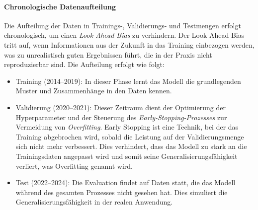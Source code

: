 \paragraph{Chronologische Datenaufteilung}
Die Aufteilung der Daten in Trainings-, Validierungs- und Testmengen erfolgt chronologisch, um einen \emph{Look-Ahead-Bias} zu verhindern. Der Look-Ahead-Bias tritt auf, wenn Informationen aus der Zukunft in das Training einbezogen werden, was zu unrealistisch guten Ergebnissen führt, die in der Praxis nicht reproduzierbar sind. Die Aufteilung erfolgt wie folgt:
\begin{itemize}
    \item Training (2014--2019): In dieser Phase lernt das Modell die grundlegenden Muster und Zusammenhänge in den Daten kennen. 
    \item Validierung (2020--2021): Dieser Zeitraum dient der Optimierung der Hyperparameter und der Steuerung des \emph{Early-Stopping-Prozesses} zur Vermeidung von \emph{Overfitting}. Early Stopping ist eine Technik, bei der das Training abgebrochen wird, sobald die Leistung auf der Validierungsmenge sich nicht mehr verbessert. Dies verhindert, dass das Modell zu stark an die Trainingsdaten angepasst wird und somit seine Generalisierungsfähigkeit verliert, was Overfitting genannt wird.
    \item Test (2022--2024): Die Evaluation findet auf Daten statt, die das Modell während des gesamten Prozesses nicht gesehen hat. Dies simuliert die Generalisierungsfähigkeit in der realen Anwendung.
\end{itemize}
